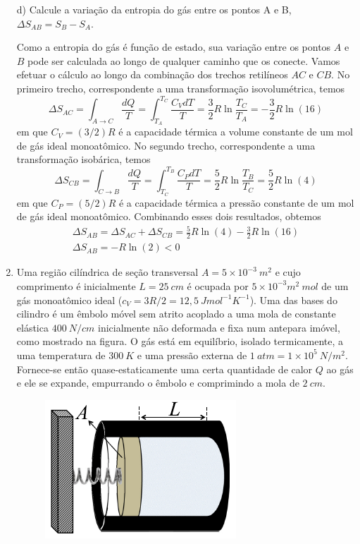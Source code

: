 \begin{enumerate}[start=1,label={\bfseries Q\arabic*.}]
d) Calcule a variação da entropia do gás entre os pontos A e B, $\Delta S_{AB} = S_{B} - S_{A}$.

\resposta Como a entropia do gás é função de estado, sua variação entre os pontos $A$ e $B$ pode ser calculada ao longo de qualquer caminho que os conecte. Vamos efetuar o cálculo ao longo da combinação dos trechos retilíneos $AC$ e $CB$. No primeiro trecho, correspondente a uma transformação isovolumétrica, temos
$$
\Delta S_{A C}=\int_{A \rightarrow C} \frac{d Q}{T}=\int_{T_{A}}^{T_{C}} \frac{C_{V} d T}{T}=\frac{3}{2} R \ln \frac{T_{C}}{T_{A}}=-\frac{3}{2} R \ln (16)
$$
em que $C_{V} = (3/2)R$ é a capacidade térmica a volume constante de um mol de gás ideal monoatômico. No segundo trecho, correspondente a uma transformação isobárica, temos
$$
\Delta S_{C B}=\int_{C \rightarrow B} \frac{d Q}{T}=\int_{T_{C}}^{T_{B}} \frac{C_{P} d T}{T}=\frac{5}{2} R \ln \frac{T_{B}}{T_{C}}=\frac{5}{2} R \ln (4)
$$
em que $C_{P} = (5/2)R$ é a capacidade térmica a pressão constante de um mol de gás ideal monoatômico. Combinando esses dois resultados, obtemos
$$\begin{array}{c}
\Delta S_{A B}=\Delta S_{A C}+\Delta S_{C B}=\frac{5}{2} R \ln (4)-\frac{3}{2} R \ln (16) \\
\Delta S_{A B}=-R \ln (2)<0
\end{array}$$





\item Uma região cilíndrica de seção transversal $A = 5 \times 10^{-3} \ m^{2}$ e cujo comprimento é inicialmente $L = 25 \ cm$ é ocupada por $5 \times 10^{-3} m^{2} \ mol$ de um gás monoatômico ideal ($c_{V} = 3R/2 = 12,5 \ Jmol^{-1} K^{-1}$). Uma das bases do cilindro é um êmbolo móvel sem atrito acoplado a uma mola de constante elástica $400 \ N/cm$ inicialmente não deformada e fixa num antepara imóvel, como mostrado na figura. O gás está em equilíbrio, isolado termicamente, a uma temperatura de $300 \ K$ e uma pressão externa de $1 \ atm = 1 \times 10^{5} \ N/m^{2}$. Fornece-se então quase-estaticamente uma certa quantidade de calor $Q$ ao gás e ele se expande, empurrando o êmbolo e comprimindo a mola de $2 \ cm$.


\begin{figure}
  \centering
  \includegraphics[scale=0.8]{termica-img/embolo.png}
\end{figure}



\end{enumerate}
